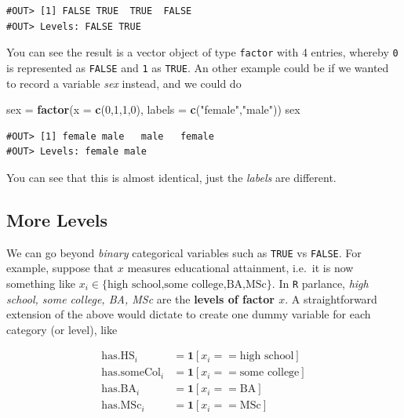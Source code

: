 \documentclass[]{book}
\newenvironment{Shaded}{\begin{snugshade}}{\end{snugshade}}
\newcommand{\KeywordTok}[1]{\textcolor[rgb]{0.13,0.29,0.53}{\textbf{#1}}}
\newcommand{\DataTypeTok}[1]{\textcolor[rgb]{0.13,0.29,0.53}{#1}}
\newcommand{\DecValTok}[1]{\textcolor[rgb]{0.00,0.00,0.81}{#1}}
\newcommand{\StringTok}[1]{\textcolor[rgb]{0.31,0.60,0.02}{#1}}
\newcommand{\NormalTok}[1]{#1}
\theoremstyle{definition}
\theoremstyle{definition}
\theoremstyle{definition}
\theoremstyle{remark}
\begin{document}
\begin{verbatim}
#OUT> [1] FALSE TRUE  TRUE  FALSE
#OUT> Levels: FALSE TRUE
\end{verbatim}

You can see the result is a vector object of type \texttt{factor} with 4
entries, whereby \texttt{0} is represented as \texttt{FALSE} and
\texttt{1} as \texttt{TRUE}. An other example could be if we wanted to
record a variable \emph{sex} instead, and we could do

\begin{Shaded}
\begin{Highlighting}[]
\NormalTok{sex =}\StringTok{ }\KeywordTok{factor}\NormalTok{(}\DataTypeTok{x =} \KeywordTok{c}\NormalTok{(}\DecValTok{0}\NormalTok{,}\DecValTok{1}\NormalTok{,}\DecValTok{1}\NormalTok{,}\DecValTok{0}\NormalTok{), }\DataTypeTok{labels =} \KeywordTok{c}\NormalTok{(}\StringTok{"female"}\NormalTok{,}\StringTok{"male"}\NormalTok{))}
\NormalTok{sex}
\end{Highlighting}
\end{Shaded}

\begin{verbatim}
#OUT> [1] female male   male   female
#OUT> Levels: female male
\end{verbatim}

You can see that this is almost identical, just the \emph{labels} are
different.

\subsection{More Levels}\label{more-levels}

We can go beyond \emph{binary} categorical variables such as
\texttt{TRUE} vs \texttt{FALSE}. For example, suppose that \(x\)
measures educational attainment, i.e.~it is now something like
\(x_i \in \{\text{high school,some college,BA,MSc}\}\). In \texttt{R}
parlance, \emph{high school, some college, BA, MSc} are the
\textbf{levels of factor \(x\)}. A straightforward extension of the
above would dictate to create one dummy variable for each category (or
level), like

\begin{align*}
\text{has.HS}_i &= \mathbf{1}[x_i==\text{high school}] \\
\text{has.someCol}_i &= \mathbf{1}[x_i==\text{some college}] \\
\text{has.BA}_i &= \mathbf{1}[x_i==\text{BA}] \\
\text{has.MSc}_i &= \mathbf{1}[x_i==\text{MSc}] 
\end{align*}
\end{document}
